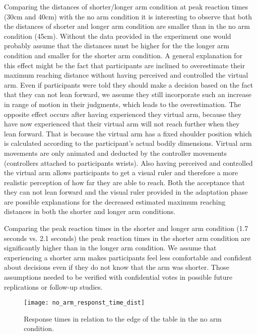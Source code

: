 Comparing the distances of shorter/longer arm condition at peak reaction times (30cm and 40cm) with the no arm condition it is interesting to observe that both the distances of shorter and longer arm condition are smaller than in the no arm condition (45cm). Without the data provided in the experiment one would probably assume that the distances must be higher for the the longer arm condition and smaller for the shorter arm condition. A general explanation for this effect might be the fact that participants are inclined to overestimate their maximum reaching distance without having perceived and controlled the virtual arm. Even if participants were told they should make a decision based on the fact that they can not lean forward, we assume they still incorporate such an increase in range of motion in their judgments, which leads to the overestimation. The opposite effect occurs after having experienced they virtual arm, because they have now experienced that their virtual arm will not reach further when they lean forward. That is because the virtual arm has a fixed shoulder position which is calculated according to the participant's actual bodily dimensions. Virtual arm movements are only animated and deducted by the controller movements (controllers attached to participants wrists). Also having perceived and controlled the virtual arm allows participants to get a visual ruler and therefore a more realistic perception of how far they are able to reach. Both the acceptance that they can not lean forward and the visual ruler provided in the adaptation phase are possible explanations for the decreased estimated maximum reaching distances in both the shorter and longer arm conditions.

Comparing the peak reaction times in the shorter and longer arm condition (1.7 seconds vs. 2.1 seconds) the peak reaction times in the shorter arm condition are significantly higher than in the longer arm condition. We assume that experiencing a shorter arm makes participants feel less comfortable and confident about decisions even if they do not know that the arm was shorter. Those assumptions needed to be verified with confidential votes in possible future replications or follow-up studies.

\begin{figure}
\centering
  \texttt{[image: no\_arm\_responst\_time\_dist]}
  \caption{Response times in relation to the edge of the table in the no arm condition.} 
  \label{fig:no_arm_responst_time_dist}
\end{figure}

